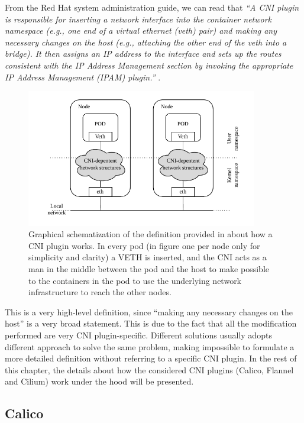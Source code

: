 From the Red Hat system administration guide, we can read that
\textit{``A CNI plugin is responsible for inserting a network interface into the
    container network namespace (e.g., one end of a virtual ethernet (veth)
    pair) and making any necessary changes on the host (e.g., attaching the
    other end of the veth into a bridge). It then assigns an IP address to the
    interface and sets up the routes consistent with the IP Address Management
    section by invoking the appropriate IP Address Management (IPAM) plugin.''
} \cite{redhat-cni}.


\begin{figure}[H]
  \centering
  \includegraphics[width=0.9\textwidth]{img/chpt2/CNI-generic}
  \caption{Graphical schematization of the definition provided in
    \cite{redhat-cni} about how a CNI plugin works. In every pod (in figure one
    per node only for simplicity and clarity) a VETH is inserted, and the CNI
    acts as a man in the middle between the pod and the host to make possible to
    the containers in the pod to use the underlying network infrastructure to
    reach the other nodes.}
  \label{fig:cni-generic}
\end{figure}


This is a very high-level definition, since ``making any necessary changes on
the host'' is a very broad statement. This is due to the fact that all the
modification performed are very CNI plugin-specific. Different solutions usually
adopts different approach to solve the same problem, making impossible to
formulate a more detailed definition without referring to a specific CNI plugin.
In the rest of this chapter, the details about how the considered CNI plugins
(Calico, Flannel and Cilium) work under the hood will be presented.


\subsection{Calico}\label{subsec:calico}

